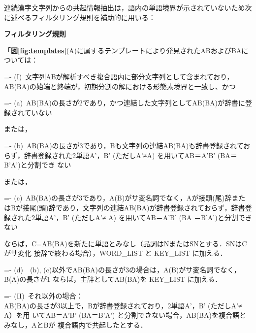 連続漢字文字列からの共起情報抽出は，語内の単語境界が示されていないため次に述べるフィルタリング規則を補助的に用いる：

\noindent
{\bf フィルタリング規則}

\noindent
「{\bf 図\ref{fig:templates}}(A)に属するテンプレートにより発見されたABおよびBAについては：

\settowidth{\leftskip}{(I)\ }
\settowidth{\parindent}{(I)\ }
\parindent=-\parindent
(I)\ 文字列ABが解析すべき複合語内に部分文字列として含まれており，AB(BA)の始端と終端が，初期分割の解における形態素境界と一致し、かつ

\settowidth{\leftskip}{(I)\ (a)\ }
\settowidth{\parindent}{(a)\ }
\parindent=-\parindent
(a)\ AB(BA)の長さが2であり，かつ連結した文字列としてAB(BA)が辞書に登録されていない

\vspace*{-5mm}
\begin{center}
または，
\end{center}
\vspace*{-3mm}

\settowidth{\leftskip}{(I)\ (b)\ }
\settowidth{\parindent}{(b)\ }
\parindent=-\parindent
(b)\ AB(BA)の長さが3であり，Bも文字列の連結AB(BA)も辞書登録されておらず，辞書登録された2単語A'，B' (ただしA'≠A) を用いてAB＝A'B' (BA＝B'A')と分割でき\break
ない

\vspace*{-5mm}
\begin{center}
または，
\end{center}
\vspace*{-3mm}

\settowidth{\leftskip}{(I)\ (c)\ }
\settowidth{\parindent}{(c)\ }
\parindent=-\parindent
(c)\ AB(BA)の長さが3であり，A(B)がサ変名詞でなく，Aが接頭(尾)辞またはBが接尾(頭)辞であり，文字列の連結AB(BA)が辞書登録されておらず，辞書登録された2単語A'，B' (ただしA'≠ A) を用いてAB＝A'B' (BA ＝B'A')と分割できない

\settowidth{\leftskip}{(I)\ }
\noindent
ならば，C=AB(BA)を新たに単語とみなし（品詞はNまたはSNとする．SNはCがサ変化\break
接辞で終わる場合），WORD\_LIST と KEY\_LIST に加える．

\settowidth{\leftskip}{(I)\ (d)\ }
\settowidth{\parindent}{(d)\ }
\parindent=-\parindent
(d)\ \ (b), (c)以外でAB(BA)の長さが3の場合は，A(B)がサ変名詞でなく，B(A)の長さが1\break
ならば，主辞としてAB(BA)を KEY\_LIST に加える．

\settowidth{\leftskip}{(II)\ }
\settowidth{\parindent}{(II)\ }
\parindent=-\parindent
(II)\ それ以外の場合：\\
AB(BA)の長さが3以上で，Bが辞書登録されており，2単語A'，B' (ただしA'≠ A）を用\break
いてAB＝A'B' (BA＝B'A') と分割できない場合，AB(BA)を複合語とみなし，AとBが\break
複合語内で共起したとする．

